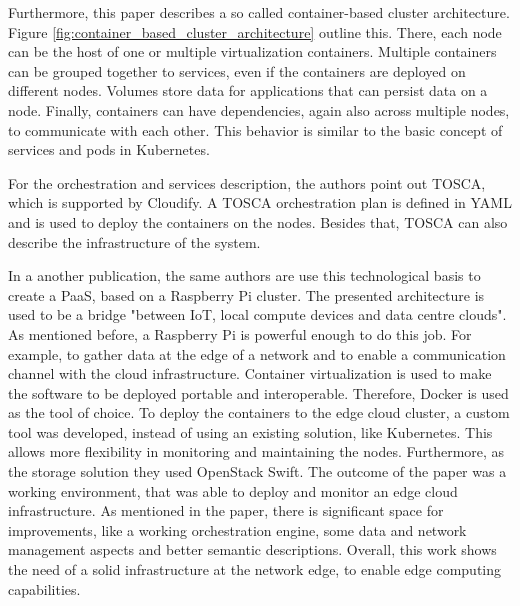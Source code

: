 Furthermore, this paper describes a so called container-based cluster architecture\autocite[cf.][p. 384]{Pahl:2015}.
Figure \ref{fig:container_based_cluster_architecture} outline this.
There, each node can be the host of one or multiple virtualization containers.
Multiple containers can be grouped together to services, even if the containers are deployed on different nodes.\autocite[cf.][p. 384]{Pahl:2015}
Volumes store data for applications that can persist data on a node.\autocite[cf.][p. 384]{Pahl:2015}
Finally, containers can have dependencies, again also across multiple nodes, to communicate with each other.\autocite[cf.][p. 384]{Pahl:2015}
This behavior is similar to the basic concept of services and pods in Kubernetes.

For the orchestration and services description, the authors point out \ac{TOSCA}, which is supported by Cloudify.
A \ac{TOSCA} orchestration plan is defined in \ac{YAML} and is used to deploy the containers on the nodes.
Besides that, \ac{TOSCA} can also describe the infrastructure of the system.

In a another publication, the same authors are use this technological basis to create a \ac{PaaS}, based on a Raspberry Pi cluster\autocite{Pahl:2016}.
The presented architecture is used to be a bridge "between IoT, local compute devices and data centre clouds"\autocite[p. 117]{Pahl:2016}.
As mentioned before, a Raspberry Pi is powerful enough to do this job.
For example, to gather data at the edge of a network and to enable a communication channel with the cloud infrastructure.\autocite[cf.][p. 117]{Pahl:2016}
Container virtualization is used to make the software to be deployed portable and interoperable.\autocite[cf.][p. 117]{Pahl:2016}
Therefore, Docker is used as the tool of choice.
To deploy the containers to the edge cloud cluster, a custom tool was developed, instead of using an existing solution, like Kubernetes.\autocite[cf.][p. 122]{Pahl:2016}
This allows more flexibility in monitoring and maintaining the nodes.\autocite[cf.][p. 122]{Pahl:2016}
Furthermore, as the storage solution they used OpenStack Swift.
The outcome of the paper was a working environment, that was able to deploy and monitor an edge cloud infrastructure.
As mentioned in the paper, there is significant space for improvements, like a working orchestration engine, some data and network management aspects and better semantic descriptions. %
Overall, this work shows the need of a solid infrastructure at the network edge, to enable edge computing capabilities.

